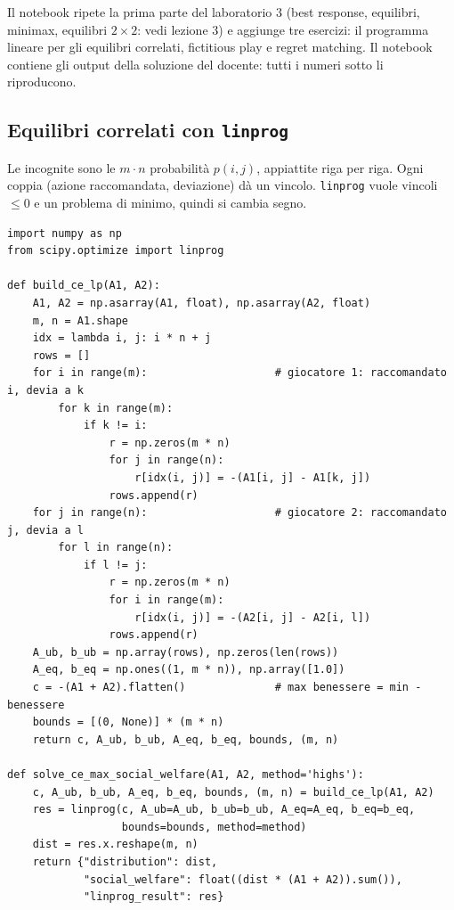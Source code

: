 Il notebook ripete la prima parte del laboratorio 3 (best response, equilibri, minimax,
equilibri $2\times2$: vedi lezione 3) e aggiunge tre esercizi: il programma lineare per gli
equilibri correlati, fictitious play e regret matching. Il notebook contiene gli output
della soluzione del docente: tutti i numeri sotto li riproducono.

\subsection{Equilibri correlati con \texttt{linprog}}

Le incognite sono le $m\cdot n$ probabilità $p(i,j)$, appiattite riga per riga. Ogni coppia
(azione raccomandata, deviazione) dà un vincolo. \texttt{linprog} vuole vincoli $\le 0$ e un
problema di minimo, quindi si cambia segno.

\begin{lstlisting}
import numpy as np
from scipy.optimize import linprog

def build_ce_lp(A1, A2):
    A1, A2 = np.asarray(A1, float), np.asarray(A2, float)
    m, n = A1.shape
    idx = lambda i, j: i * n + j
    rows = []
    for i in range(m):                    # giocatore 1: raccomandato i, devia a k
        for k in range(m):
            if k != i:
                r = np.zeros(m * n)
                for j in range(n):
                    r[idx(i, j)] = -(A1[i, j] - A1[k, j])
                rows.append(r)
    for j in range(n):                    # giocatore 2: raccomandato j, devia a l
        for l in range(n):
            if l != j:
                r = np.zeros(m * n)
                for i in range(m):
                    r[idx(i, j)] = -(A2[i, j] - A2[i, l])
                rows.append(r)
    A_ub, b_ub = np.array(rows), np.zeros(len(rows))
    A_eq, b_eq = np.ones((1, m * n)), np.array([1.0])
    c = -(A1 + A2).flatten()              # max benessere = min -benessere
    bounds = [(0, None)] * (m * n)
    return c, A_ub, b_ub, A_eq, b_eq, bounds, (m, n)

def solve_ce_max_social_welfare(A1, A2, method='highs'):
    c, A_ub, b_ub, A_eq, b_eq, bounds, (m, n) = build_ce_lp(A1, A2)
    res = linprog(c, A_ub=A_ub, b_ub=b_ub, A_eq=A_eq, b_eq=b_eq,
                  bounds=bounds, method=method)
    dist = res.x.reshape(m, n)
    return {"distribution": dist,
            "social_welfare": float((dist * (A1 + A2)).sum()),
            "linprog_result": res}
\end{lstlisting}

